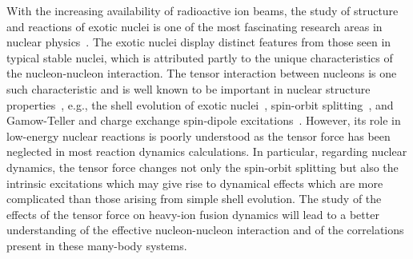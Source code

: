 With the increasing availability of radioactive ion beams, the study of structure and reactions of exotic nuclei is
one of the most fascinating research areas in nuclear physics~\citep{Balantekin2014_MPLA29-1430010}.
The exotic nuclei display distinct features from those seen in typical stable nuclei, which is attributed partly to the unique characteristics of the nucleon-nucleon interaction.
The tensor interaction between nucleons is one such characteristic and is well known to be important in nuclear structure
properties~\citep{Lesinski2007_PRC76-014312}, e.g.,
the shell evolution of exotic nuclei~\citep{Otsuka2006_PRL97-162501},
spin-orbit splitting~\citep{Colo2007_PLB646-227}, and Gamow-Teller and charge exchange spin-dipole excitations~\citep{Bai2010_PRL105-072501}.
However, its role in low-energy nuclear reactions is poorly understood as the tensor force has been neglected in most reaction dynamics calculations.
In particular, regarding nuclear dynamics, the tensor force changes not only the spin-orbit splitting but also the intrinsic excitations which may give rise to dynamical effects which are more complicated than those arising from simple shell evolution.
The study of the effects of the tensor force on heavy-ion fusion dynamics will lead to a better understanding of the effective nucleon-nucleon interaction and of the correlations present in these many-body systems.

